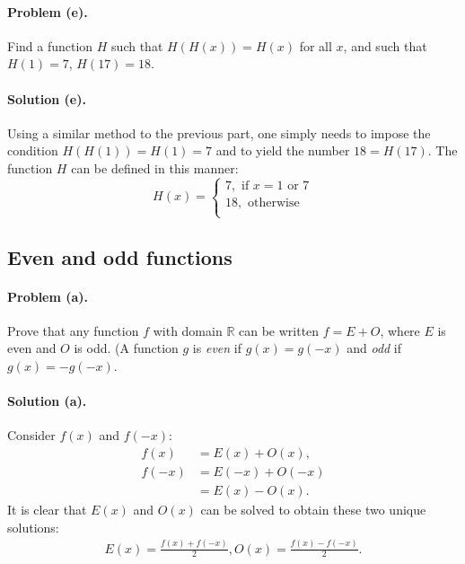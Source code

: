 \documentclass{article}
\begin{document}
\paragraph{Problem (e).} Find a function $H$ such that $H(H(x)) = H(x)$ for all $x$, and such that $H(1) = 7$, $H(17) = 18$.

\paragraph{Solution (e).} Using a similar method to the previous part, one simply needs to impose the condition $H(H(1)) = H(1) = 7$ and to yield the number $18 = H(17)$. The function $H$ can be defined in this manner: \begin{equation*}
  H(x) = \begin{cases}
    7, \text{ if } x = 1 \text{ or } 7 \\
    18, \text{ otherwise} \\
  \end{cases}
\end{equation*}

\setcounter{subsection}{12}
\subsection{Even and odd functions}

\paragraph{Problem (a).} Prove that any function $f$ with domain $\mathbb{R}$ can be written $f = E + O$, where $E$ is even and $O$ is odd. (A function $g$ is \emph{even} if $g(x) = g(-x)$ and \emph{odd} if $g(x) = -g(-x)$.

\paragraph{Solution (a).} Consider $f(x)$ and $f(-x)$: \begin{align*}
  f(x)  &= E(x) + O(x), \\
  f(-x) &= E(-x) + O(-x) \\
        &= E(x) - O(x).
\end{align*} It is clear that $E(x)$ and $O(x)$ can be solved to obtain these two unique solutions: \begin{align*}
  E(x) = \frac{f(x) + f(-x)}{2}, O(x) = \frac{f(x) - f(-x)}{2}.
\end{align*}
\end{document}
